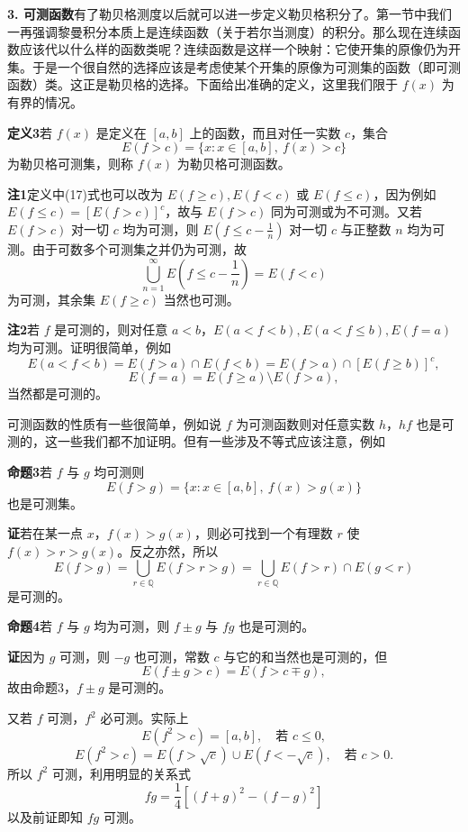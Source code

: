 \medskip
\noindent\textbf{3. 可测函数}\quad 有了勒贝格测度以后就可以进一步定义勒贝格积分了。第一节中我们一再强调黎曼积分本质上是连续函数（关于若尔当测度）的积分。那么现在连续函数应该代以什么样的函数类呢？连续函数是这样一个映射：它使开集的原像仍为开集。于是一个很自然的选择应该是考虑使某个开集的原像为可测集的函数（即可测函数）类。这正是勒贝格的选择。下面给出准确的定义，这里我们限于 $f(x)$ 为有界的情况。

\noindent\textbf{定义3}\quad 若 $f(x)$ 是定义在 $[a,b]$ 上的函数，而且对任一实数 $c$，集合
\begin{equation}
 E(f>c)=\{x:x\in[a,b],\ f(x)>c\}
 \tag{17}
\end{equation}
为勒贝格可测集，则称 $f(x)$ 为勒贝格可测函数。

\noindent\textbf{注1}\quad 定义中(17)式也可以改为 $E(f\ge c),E(f<c)$ 或 $E(f\le c)$，因为例如 $E(f\le c)=[E(f>c)]^c$，故与 $E(f>c)$ 同为可测或为不可测。又若 $E(f>c)$ 对一切 $c$ 均为可测，则 $E(f\le c-\frac1n)$ 对一切 $c$ 与正整数 $n$ 均为可测。由于可数多个可测集之并仍为可测，故
\[
 \bigcup_{n=1}^{\infty}E\left(f\le c-\frac1n\right)=E(f<c)
\]
为可测，其余集 $E(f\ge c)$ 当然也可测。

\noindent\textbf{注2}\quad 若 $f$ 是可测的，则对任意 $a<b$，$E(a<f<b),E(a<f\le b),E(f=a)$ 均为可测。证明很简单，例如
\[
 E(a<f<b)=E(f>a)\cap E(f<b)=E(f>a)\cap[E(f\ge b)]^c,
\]
\[
 E(f=a)=E(f\ge a)\setminus E(f>a),
\]
当然都是可测的。

可测函数的性质有一些很简单，例如说 $f$ 为可测函数则对任意实数 $h$，$hf$ 也是可测的，这一些我们都不加证明。但有一些涉及不等式应该注意，例如

\noindent\textbf{命题3}\quad 若 $f$ 与 $g$ 均可测则
\[
 E(f>g)=\{x:x\in[a,b],\ f(x)>g(x)\}
\]
也是可测集。

\noindent\textbf{证}\quad 若在某一点 $x$，$f(x)>g(x)$，则必可找到一个有理数 $r$ 使 $f(x)>r>g(x)$。反之亦然，所以
\[
 E(f>g)=\bigcup_{r\in\mathbb Q}E(f>r>g)
 =\bigcup_{r\in\mathbb Q}E(f>r)\cap E(g<r)
\]
是可测的。

\noindent\textbf{命题4}\quad 若 $f$ 与 $g$ 均为可测，则 $f\pm g$ 与 $fg$ 也是可测的。

\noindent\textbf{证}\quad 因为 $g$ 可测，则 $-g$ 也可测，常数 $c$ 与它的和当然也是可测的，但
\[
 E(f\pm g>c)=E(f>c\mp g),
\]
故由命题3，$f\pm g$ 是可测的。

又若 $f$ 可测，$f^2$ 必可测。实际上
\[
 E(f^2>c)=[a,b],\quad\text{若 }c\le0,
\]
\[
 E(f^2>c)=E(f>\sqrt c)\cup E(f<-\sqrt c),\quad\text{若 }c>0.
\]
所以 $f^2$ 可测，利用明显的关系式
\[
 fg=\frac14\left[(f+g)^2-(f-g)^2\right]
\]
以及前证即知 $fg$ 可测。

